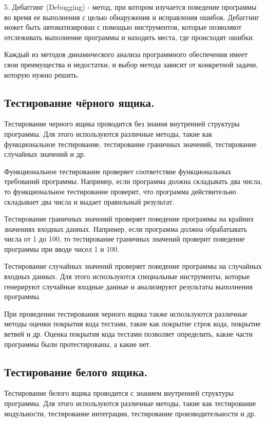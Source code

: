 \documentclass[utf8,14pt,a4paper,oneside,russian]{book}
\begin{document}
5. Дебаггинг (Debugging) - метод, при котором изучается поведение программы во время ее выполнения с целью обнаружения и исправления ошибок. Дебаггинг может быть автоматизирован с помощью инструментов, которые позволяют отслеживать выполнение программы и находить места, где происходят ошибки.

Каждый из методов динамического анализа программного обеспечения имеет свои преимущества и недостатки, и выбор метода зависит от конкретной задачи, которую нужно решить.
  
\newpage
\subsection{Тестирование чёрного ящика.}

Тестирование черного ящика проводится без знания внутренней структуры программы. Для этого используются различные методы, такие как функциональное тестирование, тестирование граничных значений, тестирование случайных значений и др. 

Функциональное тестирование проверяет соответствие функциональных требований программы. Например, если программа должна складывать два числа, то функциональное тестирование проверит, что программа действительно складывает два числа и выдает правильный результат.

Тестирование граничных значений проверяет поведение программы на крайних значениях входных данных. Например, если программа должна обрабатывать числа от 1 до 100, то тестирование граничных значений проверит поведение программы при вводе чисел 1 и 100.

Тестирование случайных значений проверяет поведение программы на случайных входных данных. Для этого используются специальные инструменты, которые генерируют случайные входные данные и анализируют результаты выполнения программы.

При проведении тестирования черного ящика также используются различные методы оценки покрытия кода тестами, такие как покрытие строк кода, покрытие ветвей и др. Оценка покрытия кода тестами позволяет определить, какие части программы были протестированы, а какие нет.

\subsection{Тестирование белого ящика.}

Тестирование белого ящика проводится с знанием внутренней структуры программы. Для этого используются различные методы, такие как тестирование модульности, тестирование интеграции, тестирование производительности и др.
\end{document}
